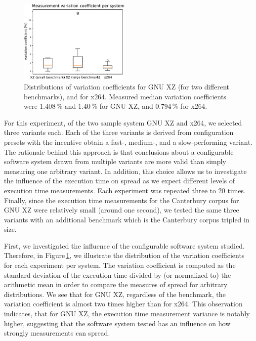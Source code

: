 \begin{figure}
 \begin{center}
   \vspace{-1cm}
   \includegraphics[width=0.48\textwidth]{images/reliability_1.eps}
 \end{center}
 \caption{Distributions of variation coefficients for
 GNU XZ (for two different benchmarks), and for x264.
 Measured median variation coefficients were
 1.408\,\% and 1.40\,\% for GNU XZ, and 0.794\,\% for
 x264.}\label{fig:reliability_1}
\end{figure}

For this experiment, of the two
sample system GNU XZ and x264, we selected three variants each. Each of the
three variants is derived from configuration presets with the incentive obtain
a fast-,  medium-, and a slow-performing variant. The rationale behind this
approach is that conclusions about a configurable software system drawn from
multiple variants are more valid than simply measuring one arbitrary variant.
In addition, this choice allows us to investigate the influence of the
execution time on spread as we expect different levels of execution time
measurements. Each experiment was repeated three to 20 times. Finally, since
the execution time measurements for the Canterbury corpus for GNU XZ were
relatively small (around one second), we tested the same three variants with an
additional benchmark which is the Canterbury corpus tripled in size.

First, we investigated the influence of the configurable software system
studied. Therefore, in Figure\,\ref{fig:reliability_1}, we illustrate the
distribution of the variation coefficients for each experiment per system. The variation
coefficient is computed as the  standard deviation of the execution time divided
by (or normalized to) the arithmetic mean in order to compare the measures of
spread for arbitrary distributions. 
We see that for GNU XZ, regardless of the benchmark, the variation coefficient
is almost two times higher than for x264. This observation indicates, that for
GNU XZ, the execution time measurement variance is notably higher, suggesting
that the software system tested has an influence on how strongly measurements
can spread.

